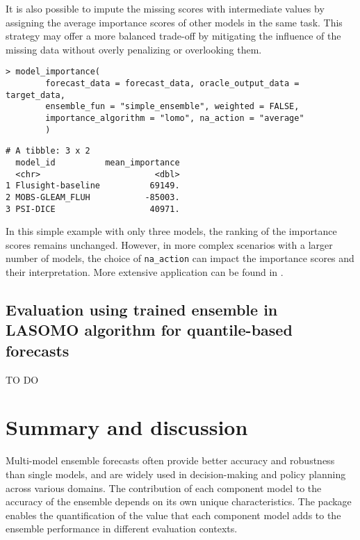 \documentclass[
  article,
  shortnames,
  notitle]{jss}
\begin{document}
It is also possible to impute the missing scores with intermediate
values by assigning the average importance scores of other models in the
same task. This strategy may offer a more balanced trade-off by
mitigating the influence of the missing data without overly penalizing
or overlooking them.

\begin{verbatim}
> model_importance(
        forecast_data = forecast_data, oracle_output_data = target_data,
        ensemble_fun = "simple_ensemble", weighted = FALSE,
        importance_algorithm = "lomo", na_action = "average"
        )
\end{verbatim}

\small

\begin{verbatim}
# A tibble: 3 x 2
  model_id          mean_importance
  <chr>                       <dbl>
1 Flusight-baseline          69149.
2 MOBS-GLEAM_FLUH           -85003.
3 PSI-DICE                   40971.
\end{verbatim}

\normalsize

In this simple example with only three models, the ranking of the
importance scores remains unchanged. However, in more complex scenarios
with a larger number of models, the choice of \texttt{na\_action} can
impact the importance scores and their interpretation. More extensive
application can be found in \citet{kim2024}.

\subsection{Evaluation using trained ensemble in LASOMO algorithm for
quantile-based forecasts}\label{sec:trained-lomo-qntl}

TO DO

\section{Summary and discussion}\label{sec:discussion}

Multi-model ensemble forecasts often provide better accuracy and
robustness than single models, and are widely used in decision-making
and policy planning across various domains. The contribution of each
component model to the accuracy of the ensemble depends on its own
unique characteristics. The  package enables the
quantification of the value that each component model adds to the
ensemble performance in different evaluation contexts.
\end{document}
